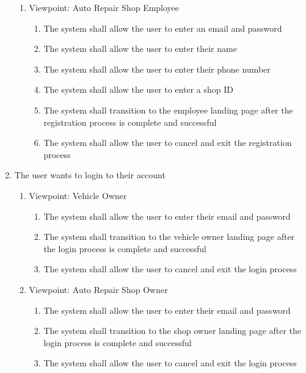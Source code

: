 \documentclass[12pt]{article}
\begin{document}
\begin{enumerate}[label=BE\arabic*., series=business_events]
\begin{enumerate}[VP\arabic*.]
		      \item Viewpoint: Auto Repair Shop Employee
		            \begin{enumerate}
			            \item The system shall allow the user to enter an email and password
			            \item The system shall allow the user to enter their name
			            \item The system shall allow the user to enter their phone number
			            \item The system shall allow the user to enter a shop ID
			            \item The system shall transition to the employee landing page after the registration process is complete
			                  and successful
			            \item The system shall allow the user to cancel and exit the registration process
		            \end{enumerate}
	      \end{enumerate}

	\item The user wants to login to their account
	      \begin{enumerate}[VP\arabic*.]
		      \item Viewpoint: Vehicle Owner
		            \begin{enumerate}
			            \item The system shall allow the user to enter their email and password
			            \item The system shall transition to the vehicle owner landing page after the login process is complete
			                  and successful
			            \item The system shall allow the user to cancel and exit the login process
		            \end{enumerate}

		      \item Viewpoint: Auto Repair Shop Owner
		            \begin{enumerate}
			            \item The system shall allow the user to enter their email and password
			            \item The system shall transition to the shop owner landing page after the login process is complete and
			                  successful
			            \item The system shall allow the user to cancel and exit the login process
		            \end{enumerate}


\end{enumerate}
\end{enumerate}
\end{document}
